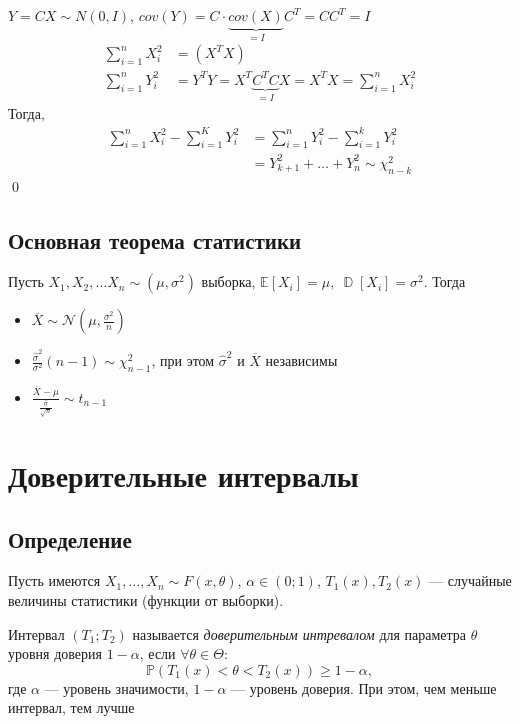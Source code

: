 \documentclass[a4paper, 10pt]{article}
\begin{document}
\proof $Y=C X \sim N(0, I)$, $cov(Y)=C\cdot \underbrace{cov(X)}_{=I}C^T=CC^T=I$
\begin{equation*}
    \begin{aligned}
        \sum_{i=1}^{n} X_{i}^{2}&=\left(X^{T} X\right)\\
        \sum_{i=1}^{n} Y_{i}^{2}&=Y^TY=X^T\underbrace{C^TC}_{=I}X=X^TX=\sum_{i=1}^{n} X_{i}^{2}
    \end{aligned}
\end{equation*}
Тогда,
\begin{equation*}
    \begin{aligned}
        \sum_{i=1}^{n} X_{i}^{2}-\sum_{i=1}^{K} Y_{i}^{2}&=\sum_{i=1}^{n} Y_{i}^{2}-\sum_{i=1}^{k} Y_{i}^{2}\\
        &=Y^2_{k+1}+\ldots+Y^2_{n}\sim\chi^2_{n-k}
    \end{aligned}
\end{equation*}\qed

\subsection{Основная теорема статистики}
\theorem Пусть $X_{1}, X_{2}, \ldots X_{n} \sim\left(\mu, \sigma^{2}\right)$ выборка, $\mathbb{E}\left[X_{i}\right]=\mu,\ \operatorname{\mathbb{D}}\left[X_{i}\right]=\sigma^{2}$. Тогда
\begin{itemize}
    \item $\overline{X}\sim \mathcal{N}\left(\mu,\frac{\sigma^{2}}{n}\right)$
    \item $\displaystyle\frac{\widehat{\sigma}^2}{\sigma^2}(n-1)\sim\chi^2_{n-1}$, при этом $\widehat{\sigma}^2$ и $\overline{X}$ независимы
    \item $\frac{\bar{X}-\mu}{\frac{\hat{\sigma}}{\sqrt{n}}} \sim t_{n-1}$ 
\end{itemize}


\newpage
\section{Доверительные интервалы}
\subsection{Определение}
Пусть имеются $X_1,\ldots,X_n\sim F(x, \theta)$, $\alpha\in(0;1)$, $T_1(x), T_2(x)$ — случайные величины статистики (функции от выборки).

 Интервал $(T_1;T_2)$ называется \textit{доверительным интревалом} для параметра $\theta$ уровня доверия $1-\alpha$, если $\forall\theta\in\Theta$:
\begin{equation*}
    \mathbb{P}\left(T_1(x)<\theta<T_2(x)\right)\geqslant1-\alpha,
\end{equation*}
где $\alpha$ — уровень значимости, $1-\alpha$ — уровень доверия. При этом, чем меньше интервал, тем лучше
\end{document}
